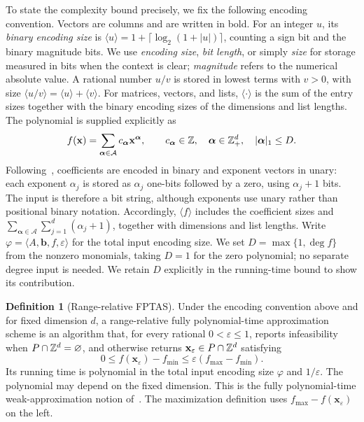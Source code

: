 \documentclass[11pt]{article}
\theoremstyle{definition}\newtheorem{definition}{Definition}[section]
\theoremstyle{remark}\newtheorem{remark}[theorem]{Remark}
\newcommand{\eps}{\varepsilon}
\begin{document}
To state the complexity bound precisely, we fix the following encoding convention. Vectors are columns and are written in bold. For an integer $u$, its \emph{binary encoding size} is $\langle u\rangle=1+\lceil\log_2(1+|u|)\rceil$, counting a sign bit and the binary magnitude bits. We use \emph{encoding size}, \emph{bit length}, or simply \emph{size} for storage measured in bits when the context is clear; \emph{magnitude} refers to the numerical absolute value. A rational number $u/v$ is stored in lowest terms with $v>0$, with size $\langle u/v\rangle=\langle u\rangle+\langle v\rangle$. For matrices, vectors, and lists, $\langle\cdot\rangle$ is the sum of the entry sizes together with the binary encoding sizes of the dimensions and list lengths. The polynomial is supplied explicitly as
\[
 f(\mathbf{x})=\sum_{\boldsymbol{\alpha}\in\mathcal A}c_{\boldsymbol{\alpha}}\mathbf{x}^{\boldsymbol{\alpha}},
 \qquad c_{\boldsymbol{\alpha}}\in\mathbb Z,\quad \boldsymbol{\alpha}\in\mathbb Z_+^d,\quad |\boldsymbol{\alpha}|_1\le D.
\]
Following~\cite{DHKW08}, coefficients are encoded in binary and exponent vectors in unary: each exponent $\alpha_j$ is stored as $\alpha_j$ one-bits followed by a zero, using $\alpha_j+1$ bits. The input is therefore a bit string, although exponents use unary rather than positional binary notation. Accordingly, $\langle f\rangle$ includes the coefficient sizes and $\sum_{\boldsymbol{\alpha}\in\mathcal A}\sum_{j=1}^d(\alpha_j+1)$, together with dimensions and list lengths. Write $\varphi=\langle A,\mathbf b,f,\eps\rangle$ for the total input encoding size. We set $D=\max\{1,\deg f\}$ from the nonzero monomials, taking $D=1$ for the zero polynomial; no separate degree input is needed. We retain $D$ explicitly in the running-time bound to show its contribution.

\begin{definition}[Range-relative FPTAS]\label{def:fptas}
Under the encoding convention above and for fixed dimension $d$, a range-relative fully polynomial-time approximation scheme is an algorithm that, for every rational $0<\eps\le1$, reports infeasibility when $P\cap\mathbb Z^d=\varnothing$, and otherwise returns $\mathbf{x}_{\eps}\in P\cap\Z^d$ satisfying
\begin{equation}\label{eq:guarantee}
 0\le f(\mathbf{x}_{\eps})-f_{\min}\le\eps(f_{\max}-f_{\min}).
\end{equation}
Its running time is polynomial in the total input encoding size $\varphi$ and $1/\eps$. The polynomial may depend on the fixed dimension. This is the fully polynomial-time weak-approximation notion of~\cite{DHKW08}. The maximization definition uses $f_{\max}-f(\mathbf{x}_{\eps})$ on the left.
\end{definition}
\end{document}
